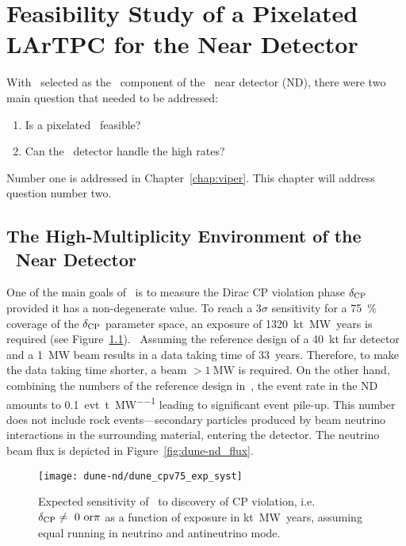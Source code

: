 \chapter{Feasibility Study of a Pixelated LArTPC for the \dune Near Detector}
\label{chap:dune-nd}

With \AC\ selected as  the \lar\ component of the \dune\ near detector (ND), there were two main question that needed to be addressed:
\begin{enumerate}
	\item Is a pixelated \lartpc\ feasible?
	\item Can the \lar\ detector handle the high rates?
\end{enumerate}
Number one is addressed in Chapter~\ref{chap:viper}.
This chapter will address question number two.


\section{The High-Multiplicity Environment of the \dune\ Near Detector}
\label{sec:dune-nd_multiplicity}

One of the main goals of \dune\ is to measure the Dirac CP violation phase $\delta_{\mathrm{CP}}$ provided it has a non-degenerate value.
To reach a $3 \sigma$ sensitivity for a \SI{75}{\percent} coverage of the $\delta_{\mathrm{CP}}$ parameter space, an exposure of \SI{1320}{\kilo\tonne\mega\watt years} is required (see Figure~\ref{fig:dune-nd_cpv-sens}).~\cite{dune2}
Assuming the reference design of a \SI{40}{\kilo\tonne} far detector and a \SI{1}{\mega\watt} beam results in a data taking time of \SI{33}{years}.
Therefore, to make the data taking time shorter, a beam $> \SI{1}{\mega\watt}$ is required.
On the other hand, combining the numbers of the reference design in~\cite{dune2}, the event rate in the ND amounts to \SI{0.1}{evt\per\tonne\per\mega\watt} leading to significant event pile-up.
This number does not include rock events---secondary particles produced by beam neutrino interactions in the surrounding material, entering the detector.
The neutrino beam flux is depicted in Figure~\ref{fig:dune-nd_flux}.

\begin{figure}[htb]
	\centering
	\texttt{[image: dune-nd/dune\_cpv75\_exp\_syst]}
	\caption{Expected sensitivity of \dune\ to discovery of CP violation, i.e.\ $\delta_{\mathrm{CP}} \neq\ 0\ \mathrm{or} \pi$ as a function of exposure in \si{\kilo\tonne\mega\watt years}, assuming equal running in neutrino and antineutrino mode.~\cite{dune2}}
	\label{fig:dune-nd_cpv-sens}
\end{figure}

